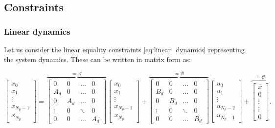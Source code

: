 \documentclass[a4paper,12pt,fleqn]{article}
\newcommand{\Np}{{N_p}}
\begin{document}
\subsection{Constraints}
\subsubsection{Linear dynamics}
Let us consider the linear equality constraints \eqref{eq:linear_dynamics} representing the system dynamics. These can 
be written in matrix form as:
\begin{small}
\begin{equation}
\begin{bmatrix}
x_0\\
x_1\\
\vdots\\
x_{\Np-1}\\
x_{\Np}
\end{bmatrix}=
\overbrace{
\begin{bmatrix}
 0      &0      &\dots  &0\\
 A_d    &0      &\dots  & 0\\
 0      &A_d    &\dots  &0\\
 \vdots &0      &\ddots & 0\\
 0      &0      &\dots  &A_d
\end{bmatrix}
}^{=\mathcal{A}}
\begin{bmatrix}
x_0\\
x_1\\
\vdots\\
x_{\Np-1}\\
x_{\Np} 
\end{bmatrix} +
\overbrace{
\begin{bmatrix}
 0      &0      &\dots  &0\\
 B_d    &0      &\dots  & 0\\
 0      &B_d    &\dots  &0\\
 \vdots &0      &\ddots & 0\\
 0      &0      &\dots  &B_d
\end{bmatrix}
}^{=\mathcal{B}}
\begin{bmatrix}
u_0\\
u_1\\
\vdots\\
u_{\Np-2}\\
u_{\Np-1} 
\end{bmatrix} +
\overbrace{
\begin{bmatrix}
\bar x\\
0\\
\vdots\\
\vdots \\
0 
\end{bmatrix}
}^{=\mathcal{C}}.
\end{equation}
\end{small}
\end{document}
